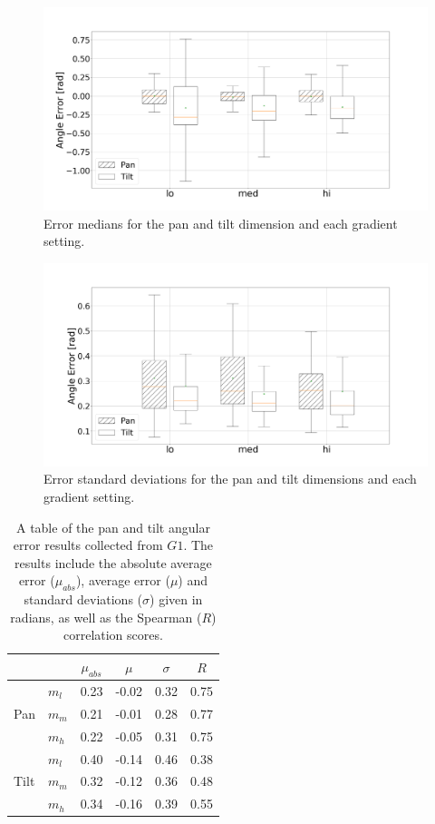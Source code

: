 \documentclass[sigconf, screen=true, anonymous=true]{acmart}
\begin{document}
\begin{figure}
  \centering
  \includegraphics[clip, trim=20 -70 100 100, width=0.8\columnwidth]{figures/err_boxplot_medians.png}
  \caption{Error medians for the pan and tilt dimension and each gradient setting.} \label{fig:err-boxplot-median}
\end{figure}

\begin{figure}
  \centering
  \includegraphics[clip, trim=80 -70 100 0, width=0.8\columnwidth]{figures/err_boxplot_std.png}
  \caption{Error standard deviations for the pan and tilt dimensions and each gradient setting.}\label{fig:err-boxplot-std}
\end{figure}

\begin{table}
  \centering
  \caption{A table of the pan and tilt angular error results collected from $G1$. The results include the absolute average error ($\mu_{abs}$), average error ($\mu$) and standard deviations ($\sigma$) given in radians, as well as the Spearman ($R$) correlation scores.}\label{tab:results}
  \begin{tabular}{llcccc}
    \toprule
    \multicolumn{2}{c}{} & $\mu_{abs}$ & $\mu$ & $\sigma$ & $R$ \\\midrule
         & $m_l$ & 0.23 & -0.02 & 0.32 & 0.75 \\%
    Pan  & $m_m$ & 0.21 & -0.01 & 0.28 & 0.77 \\%
         & $m_h$ & 0.22 & -0.05 & 0.31 & 0.75 \\\midrule
         & $m_l$ & 0.40 & -0.14 & 0.46 & 0.38 \\%
    Tilt & $m_m$ & 0.32 & -0.12 & 0.36 & 0.48 \\%
         & $m_h$ & 0.34 & -0.16 & 0.39 & 0.55 \\
    \bottomrule
  \end{tabular}
\end{table}
\end{document}
